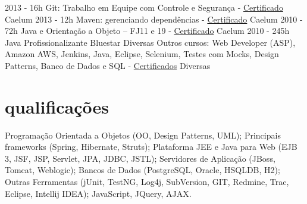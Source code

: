 \begin{entrylistii}
  \entryii
    {2013 - 16h}
    {Git: Trabalho em Equipe com Controle e Segurança - \href{https://www.alura.com.br/user/3311/fullCertificate/bdd8817990ef209f0fb6b049f2d2ea0c}{Certificado}}
    {Caelum}
  \entryii
    {2013 - 12h}
    {Maven: gerenciando dependências - \href{https://www.alura.com.br/user/3311/fullCertificate/bdd8817990ef209f0fb6b049f2d2ea0c}{Certificado}}
    {Caelum}
  \entryii
    {2010 - 72h}
    {Java e Orientação a Objeto – FJ11 e 19 - \href{https://www.alura.com.br/user/3311/fullCertificate/bdd8817990ef209f0fb6b049f2d2ea0c}{Certificado}}
    {Caelum}
  \entryii
    {2010 - 245h}
    {Java Profissionalizante}
    {Bluestar}
  \entryii
    {Diversas}
    {Outros cursos: Web Developer (ASP), Amazon AWS, Jenkins, Java, Eclipse, Selenium, Testes com Mocks, Design Patterns, Banco de Dados e SQL - \href{https://www.alura.com.br/user/3311/fullCertificate/bdd8817990ef209f0fb6b049f2d2ea0c}{Certificados}}
    {Diversas}
\end{entrylistii}

\newpage

\section{qualificações}

Programação Orientada a Objetos (OO, Design Patterns, UML); Principais frameworks (Spring, Hibernate, Struts); Plataforma JEE e Java para Web (EJB 3, JSF, JSP, Servlet, JPA, JDBC, JSTL); Servidores de Aplicação (JBoss, Tomcat, Weblogic); Bancos de Dados (PostgreSQL, Oracle, HSQLDB, H2); Outras Ferramentas (jUnit, TestNG, Log4j, SubVersion, GIT, Redmine, Trac, Eclipse, Intellij IDEA); JavaScript, JQuery, AJAX.

